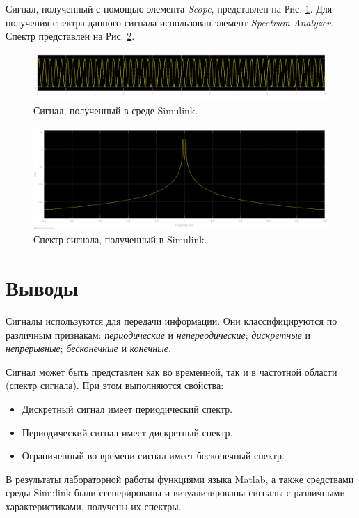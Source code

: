 \documentclass[a4paper,14pt]{extarticle}
\begin{document}
Сигнал, полученный с помощью элемента \textit{Scope}, представлен на Рис. \ref{simulink_signal}. Для получения спектра данного сигнала использован элемент \textit{Spectrum Analyzer}. Спектр представлен на Рис. \ref{simulink_signal_}.
\begin{figure}[H]
\centering
\includegraphics[scale=0.5]{pics/simulink_001.png}
\caption{Сигнал, полученный в среде Simulink.}
\label{simulink_signal}
\end{figure}
\begin{figure}[H]
\centering
\includegraphics[scale=0.5]{pics/simulink_spec.png}
\caption{Спектр сигнала, полученный в Simulink.}
\label{simulink_signal_}
\end{figure}

\section{Выводы}
Сигналы используются для передачи информации. Они классифицируются по различным признакам: \textit{периодические} и \textit{непереодические}; \textit{дискретные} и \textit{непрерывные}; \textit{бесконечные} и \textit{конечные}.

Сигнал может быть представлен как во временной, так и в частотной области (спектр сигнала). При этом выполняются свойства:
\begin{itemize}
\setlength\itemsep{0.1cm}
\item Дискретный сигнал имеет периодический спектр.
\item Периодический сигнал имеет дискретный спектр.
\item Ограниченный во времени сигнал имеет бесконечный спектр.
\end{itemize}

В результаты лабораторной работы функциями языка Matlab, а также средствами среды Simulink были сгенерированы и визуализированы сигналы с различными характеристиками, получены их спектры.
\end{document}
